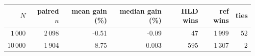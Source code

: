 \begin{tabular}{rrrrrrr}
\hline
$N$ & paired $n$ & mean gain (\%) & median gain (\%) & HLD wins & ref wins & ties \\
\hline
$1\,000$ & 2\,098 & -0.51 & -0.09 & 47 & 1\,999 & 52 \\
$10\,000$ & 1\,904 & -8.75 & -0.003 & 595 & 1\,307 & 2 \\
\hline
\end{tabular}
